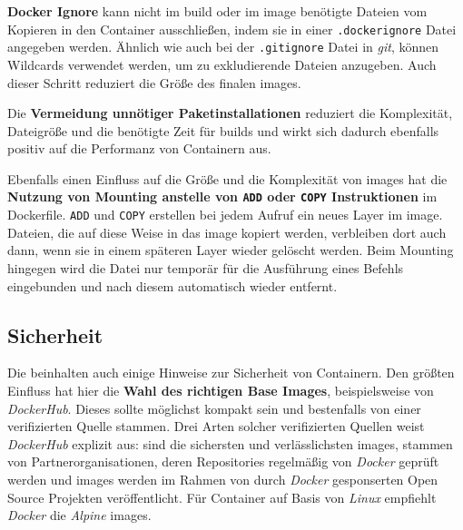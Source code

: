 \textbf{Docker Ignore} kann nicht im \Gls{build} oder im \Gls{image} benötigte Dateien vom Kopieren in den Container ausschließen, indem sie in einer \texttt{.dockerignore} Datei angegeben werden. Ähnlich wie auch bei der \texttt{.gitignore} Datei in \textit{\Gls{git}}, können Wildcards verwendet werden, um zu exkludierende Dateien anzugeben. Auch dieser Schritt reduziert die Größe des finalen \Glspl{image}. \cite{300:Building-Best-Practices}

Die \textbf{Vermeidung unnötiger Paketinstallationen} reduziert die Komplexität, Dateigröße und die benötigte Zeit für \Glspl{build} und wirkt sich dadurch ebenfalls positiv auf die Performanz von Containern aus. \cite{300:Building-Best-Practices}

Ebenfalls einen Einfluss auf die Größe und die Komplexität von \Glspl{image} hat die \textbf{Nutzung von Mounting anstelle von \texttt{ADD} oder \texttt{COPY} Instruktionen} im Dockerfile. \texttt{ADD} und \texttt{COPY} erstellen bei jedem Aufruf ein neues Layer im \Gls{image}. Dateien, die auf diese Weise in das \Gls{image} kopiert werden, verbleiben dort auch dann, wenn sie in einem späteren Layer wieder gelöscht werden. Beim Mounting hingegen wird die Datei nur temporär für die Ausführung eines Befehls eingebunden und nach diesem automatisch wieder entfernt. \cite{300:Building-Best-Practices}

\subsection{Sicherheit}
\label{subsec:05-03-02_security}

Die  beinhalten auch einige Hinweise zur Sicherheit von Containern. Den größten Einfluss hat hier die \textbf{Wahl des richtigen Base Images}, beispielsweise von \textit{DockerHub}. Dieses sollte möglichst kompakt sein und bestenfalls von einer verifizierten Quelle stammen. Drei Arten solcher verifizierten Quellen weist \textit{DockerHub} explizit aus:  sind die sichersten und verlässlichsten \Glspl{image},  stammen von Partnerorganisationen, deren Repositories regelmäßig von \textit{Docker} geprüft werden und  \Glspl{image} werden im Rahmen von durch \textit{Docker} gesponserten Open Source Projekten veröffentlicht. Für Container auf Basis von \textit{Linux} empfiehlt \textit{Docker} die \textit{Alpine} \Glspl{image}. \cite{300:Building-Best-Practices}


